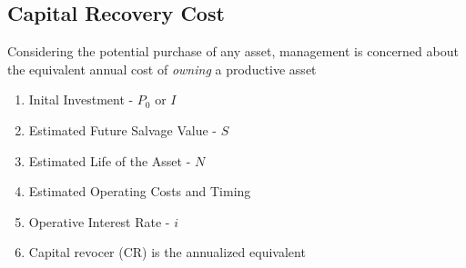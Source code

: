\documentclass{report} %
\begin{document}
\subsection*{Capital Recovery Cost}
Considering the potential purchase of any asset, management is concerned about the equivalent annual cost of \emph{owning} a productive asset
\begin{enumerate}
    \item Inital Investment - $P_0$ or $I$
    \item Estimated Future Salvage Value - $S$
    \item Estimated Life of the Asset - $N$
    \item Estimated Operating Costs and Timing
    \item Operative Interest Rate - $i$
    \item Capital revocer (CR) is the annualized equivalent
\end{enumerate}
\end{document}
